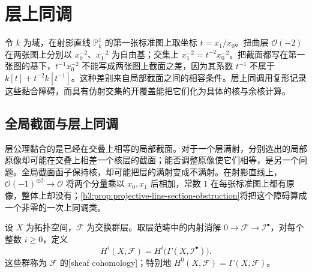 
\section{层上同调}
\label{b3:sec:2405}

令 \(k\) 为域，在射影直线 \(\mathbb P_k^1\) 的第一张标准图上取坐标 \(t=x_1/x_0\)。扭曲层 \(\mathcal O(-2)\) 在两张图上分别以 \(x_0^{-2}\)、\(x_1^{-2}\) 为自由基；交集上 \(x_1^{-2}=t^{-2}x_0^{-2}\)。把截面都写在第一张图的基下，\(t^{-1}x_0^{-2}\) 不能写成两张图上截面之差，因为其系数 \(t^{-1}\) 不属于 \(k[t]+t^{-2}k[t^{-1}]\)。这种差别来自局部截面之间的相容条件。层上同调用复形记录这些黏合障碍，而具有仿射交集的开覆盖能把它们化为具体的核与余核计算。

%
%
%

\subsection{全局截面与层上同调}
\label{b3:subsec:2404:02}
\label{b3:subsec:2405:01}

层公理黏合的是已经在交叠上相等的局部截面。对于一个层满射，分别选出的局部原像却可能在交叠上相差一个核层的截面；能否调整原像使它们相等，是另一个问题。全局截面函子保持核，却可能把层的满射变成不满射。在射影直线上，\(\mathcal O(-1)^{\oplus2}\to\mathcal O\) 将两个分量乘以 \(x_0,x_1\) 后相加，常数 \(1\) 在每张标准图上都有原像，整体上却没有；\cref{b3:prop:projective-line-section-obstruction}将把这个障碍算成一个非零的一次上同调类。

\begin{definition}\label{b3:def:sheaf-cohomology}
	设 \(X\) 为拓扑空间，\(\mathcal F\) 为交换群层。取层范畴中的内射消解 \(0\rightarrow\mathcal F\rightarrow\mathcal I^\bullet\)，对每个整数 \(i\ge0\)，定义
	\[
		H^i(X,\mathcal F)=H^i\bigl(\Gamma(X,\mathcal I^\bullet)\bigr).
	\]
	这些群称为 \(\mathcal F\) 的[sheaf cohomology]；特别地 \(H^0(X,\mathcal F)=\Gamma(X,\mathcal F)\)。
\end{definition}

